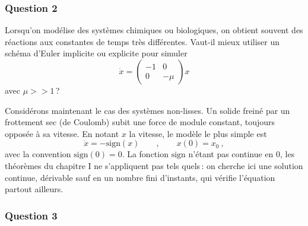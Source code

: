\hypertarget{ed2-impl-2}{%
\subsubsection*{Question 2}\label{ed2-impl-2}}


Lorsqu'on modélise des systèmes chimiques ou biologiques, on obtient
souvent des réactions aux constantes de temps très différentes. Vaut-il
mieux utiliser un schéma d'Euler implicite ou explicite pour simuler \[
\dot{x} = \left(
  \begin{matrix}
  -1 & 0 \\
  0 & -\mu
  \end{matrix}
  \right) x 
\] avec \(\mu >> 1\)\,?

\vspace{1em}
Consid\'erons maintenant le cas des syst\`emes non-lisses. Un solide freiné par un frottement sec (de Coulomb) subit une force de
module constant, toujours opposée à sa vitesse. En notant \(x\) la
vitesse, le modèle le plus simple est \[
\dot{x} = -\mathrm{sign}(x) \qquad , \qquad x(0) = x_0 \ ,
\] avec la convention \(\mathrm{sign}(0) = 0\). La fonction
\(\mathrm{sign}\) n'étant pas continue en 0, les théorèmes du chapitre
I ne s'appliquent pas tels quels\,: on cherche ici une solution
continue, dérivable sauf en un nombre fini d'instants, qui vérifie
l'équation partout ailleurs.

\hypertarget{ed2-impl-3}{%
\subsubsection*{Question 3}\label{ed2-impl-3}}


